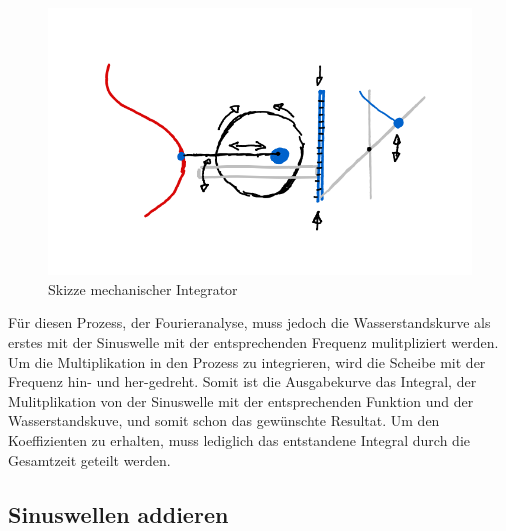 \begin{figure}
	\centering
	\includegraphics[width=\linewidth]{"papers/gezeiten/Skizze Integralmaschine"}
	\caption{Skizze mechanischer Integrator}
	\label{fig:skizze-integralmaschine}
\end{figure}

Für diesen Prozess, der Fourieranalyse, muss jedoch die  Wasserstandskurve als erstes mit der Sinuswelle mit der entsprechenden Frequenz mulitpliziert werden.
Um die Multiplikation in den Prozess zu integrieren, wird die Scheibe mit der Frequenz hin- und her-gedreht.
Somit ist die Ausgabekurve das Integral, der Mulitplikation von der Sinuswelle mit der entsprechenden Funktion und der Wasserstandskuve, und somit schon das gewünschte Resultat.
Um den Koeffizienten zu erhalten, muss lediglich das entstandene Integral durch die Gesamtzeit geteilt werden.

\subsection{Sinuswellen addieren}

